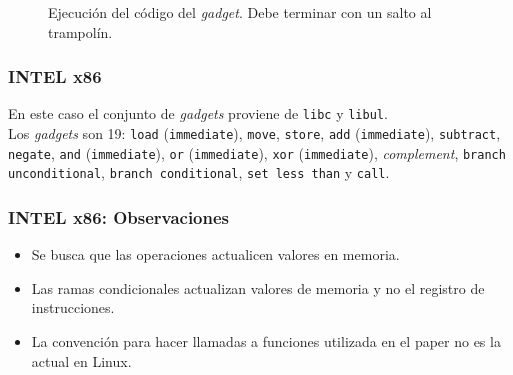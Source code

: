 \documentclass{beamer}
\begin{document}
\begin{frame}
{\begin{figure}[h]
            \caption{Ejecución del código del \textit{gadget}. Debe terminar con un salto al trampolín.}
        \end{figure}

    }
\end{frame}

\begin{frame}
    \frametitle{INTEL x86}
    En este caso el conjunto de \textit{gadgets} proviene de \texttt{libc} y \texttt{libul}. \\

    Los \textit{gadgets} son 19: \texttt{load} (\texttt{immediate}), \texttt{move}, \texttt{store}, \texttt{add} (\texttt{immediate}), \texttt{subtract}, \texttt{negate}, \texttt{and} (\texttt{immediate}), \texttt{or} (\texttt{immediate}), \texttt{xor} (\texttt{immediate}), \textit{complement}, \texttt{branch unconditional}, \texttt{branch conditional}, \texttt{set less than} y \texttt{call}. 
\end{frame}

\begin{frame}
    \frametitle{INTEL x86: Observaciones}
    \begin{itemize}
        \item Se busca que las operaciones actualicen valores en memoria.
        \item Las ramas condicionales actualizan valores de memoria y no el registro de instrucciones.
        \item La convención para hacer llamadas a funciones utilizada en el paper no es la actual en Linux.
    \end{itemize}
\end{frame}
\end{document}
